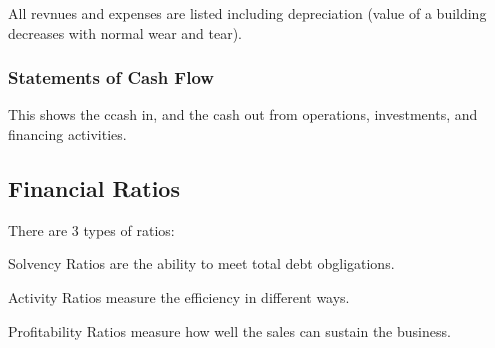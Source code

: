 \documentclass[12pt,letterpaper]{article} \usepackage{amsmath} \usepackage{graphicx} \usepackage[margin=1in]{geometry} \usepackage{longtable}  \usepackage{amssymb}
\begin{document}
 		All revnues and expenses are listed including depreciation (value of a building decreases with normal wear and tear).
		
		\subsubsection{Statements of Cash Flow}
		This shows the ccash in, and the cash out from operations, investments, and financing activities. 
		
		\subsection{Financial Ratios}
		There are 3 types of ratios:
		
		Solvency Ratios are the ability to meet total debt obgligations. 
		
		Activity Ratios measure the efficiency in different ways. 
		
		Profitability Ratios measure how well the sales can sustain the business. 
	
\end{document}
